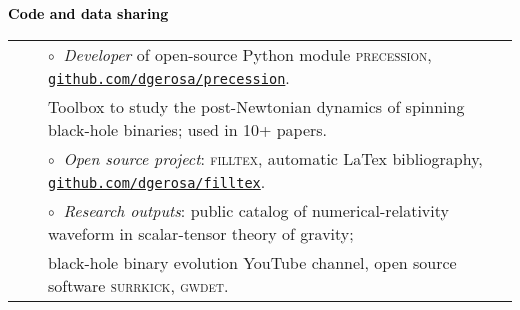 \documentclass[letterpaper]{moderncv}
\begin{document}
\newpage
\vspace{0.2cm}
\textbf{\textcolor{black}{Code and data sharing}}\vspace{0.05cm}\\
\begin{tabular}{rcl}
&\hspace{0.4cm} &$\circ\;\;${\textit{Developer}} of open-source Python module \textsc{precession}, \href{https://github.com/dgerosa/precession}{\texttt{github.com/dgerosa/precession}}.
\\ &\hspace{0.4cm} &  \hspace{0.4cm}Toolbox to study the post-Newtonian dynamics of  spinning black-hole binaries; used in 10+  papers. \\
&\hspace{0.4cm} &$\circ\;\;${\textit{Open source project}}: \textsc{filltex}, automatic LaTex bibliography, \href{https://github.com/dgerosa/filltex}{\texttt{github.com/dgerosa/filltex}}.\\
&\hspace{0.4cm} &$\circ\;\;$\textit{Research outputs}: public catalog of numerical-relativity waveform in scalar-tensor theory of gravity; 
\\ &\hspace{0.4cm} &  \hspace{0.4cm}black-hole binary evolution YouTube channel, open source software \textsc{surrkick}, \textsc{gwdet}.
\end{tabular}

\end{document}
